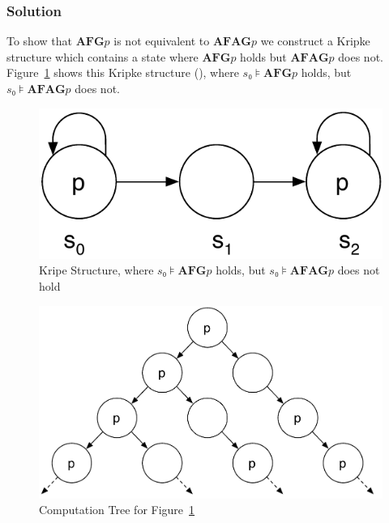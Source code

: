 \documentclass[a4paper, 12pt]{article}
\begin{document}
\subsubsection{Solution}

To show that $\mathbf{AFG} p$ is not equivalent to $\mathbf{AFAG} p$ we
construct a Kripke structure which contains a state where $\mathbf{AFG} p$
holds but $\mathbf{AFAG} p$ does not.
Figure~\ref{figure:Kripke_Structure_Exercise_6} shows this Kripke structure
(\cite{Veith2011ExerciseSolutions}), where $s₀⊧\mathbf{AFG} p$ holds, but
$s₀⊧\mathbf{AFAG} p$ does not.

\begin{figure}[htbp]
    \centering
        \includegraphics[width=.4\textwidth]
            {Figures/Kripke Structure Exercise 6.pdf}
    \caption{Kripe Structure, where $s₀⊧\mathbf{AFG} p$ holds, but
             $s₀⊧\mathbf{AFAG} p$ does not hold}
    \label{figure:Kripke_Structure_Exercise_6}
\end{figure}

\begin{figure}[htbp]
    \centering
        \includegraphics[width=.7\textwidth]
            {Figures/Computation Tree Exercise 6.pdf}
    \caption{Computation Tree for
             Figure~\ref{figure:Kripke_Structure_Exercise_6}}
    \label{figure:Computation_Tree_Exercise_6}
\end{figure}
\end{document}
